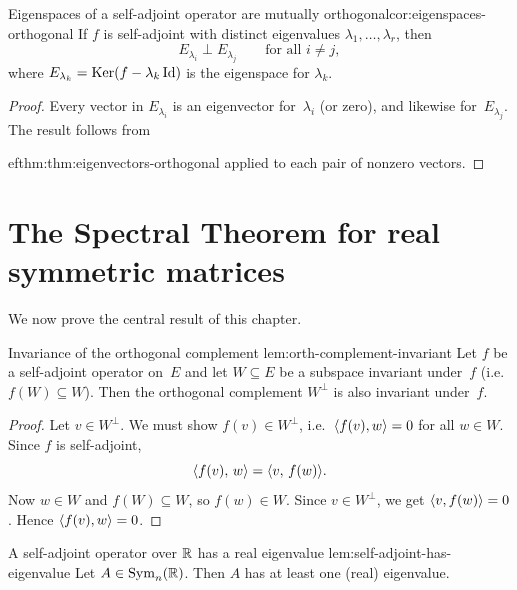 \begin{corollary}{Eigenspaces of a self-adjoint operator are mutually
orthogonal}{cor:eigenspaces-orthogonal}
If $f$ is self-adjoint with distinct eigenvalues
$\lambda_1,\ldots,\lambda_r$, then
\[
  E_{\lambda_i} \perp E_{\lambda_j}
  \qquad\text{for all } i\neq j,
\]
where $E_{\lambda_k} = \operatorname{Ker}(f - \lambda_k\operatorname{Id})$ is the eigenspace for
$\lambda_k$.
\end{corollary}

\begin{proof}
Every vector in $E_{\lambda_i}$ is an eigenvector for~$\lambda_i$
(or zero), and likewise for~$E_{\lambda_j}$.  The result follows from

ef{thm:thm:eigenvectors-orthogonal} applied to each pair of nonzero vectors.
\end{proof}


\section{The Spectral Theorem for real symmetric matrices}%
\label{sec:spectral-real}

We now prove the central result of this chapter.

\begin{lemma}{Invariance of the orthogonal complement}%
{lem:orth-complement-invariant}
Let $f$ be a self-adjoint operator on~$E$ and let $W\subseteq E$ be a
subspace invariant under~$f$ (i.e.\ $f(W)\subseteq W$).  Then the
orthogonal complement $W^\perp$ is also invariant under~$f$.
\end{lemma}

\begin{proof}
Let $v\in W^\perp$.  We must show $f(v)\in W^\perp$, i.e.\
$\langle f(v),w\rangle=0$ for all $w\in W$.  Since $f$ is self-adjoint,
\[
  \langle f(v),\,w\rangle = \langle v,\,f(w)\rangle.
\]
Now $w\in W$ and $f(W)\subseteq W$, so $f(w)\in W$.  Since
$v\in W^\perp$, we get $\langle v,f(w)\rangle=0$.  Hence $\langle f(v),w\rangle=0$.
\end{proof}

\begin{lemma}{A self-adjoint operator over ${\mathbb{R}}$ has a real eigenvalue}%
{lem:self-adjoint-has-eigenvalue}
Let $A\in\operatorname{Sym}_n({\mathbb{R}})$.  Then $A$ has at least one (real) eigenvalue.
\end{lemma}

